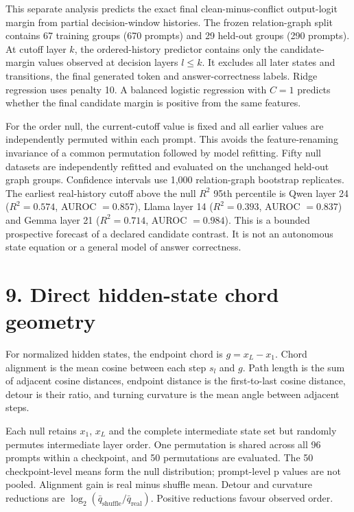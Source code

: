\documentclass[10pt]{article}
\begin{document}
This separate analysis predicts the exact final clean-minus-conflict output-logit margin from partial decision-window histories. The frozen relation-graph split contains 67 training groups (670 prompts) and 29 held-out groups (290 prompts). At cutoff layer \(k\), the ordered-history predictor contains only the candidate-margin values observed at decision layers \(l\leq k\). It excludes all later states and transitions, the final generated token and answer-correctness labels. Ridge regression uses penalty 10. A balanced logistic regression with \(C=1\) predicts whether the final candidate margin is positive from the same features.

For the order null, the current-cutoff value is fixed and all earlier values are independently permuted within each prompt. This avoids the feature-renaming invariance of a common permutation followed by model refitting. Fifty null datasets are independently refitted and evaluated on the unchanged held-out graph groups. Confidence intervals use 1,000 relation-graph bootstrap replicates. The earliest real-history cutoff above the null \(R^2\) 95th percentile is Qwen layer 24 (\(R^2=0.574\), AUROC \(=0.857\)), Llama layer 14 (\(R^2=0.393\), AUROC \(=0.837\)) and Gemma layer 21 (\(R^2=0.714\), AUROC \(=0.984\)). This is a bounded prospective forecast of a declared candidate contrast. It is not an autonomous state equation or a general model of answer correctness.

\section*{9. Direct hidden-state chord geometry}

For normalized hidden states, the endpoint chord is \(g=x_L-x_1\). Chord alignment is the mean cosine between each step \(s_l\) and \(g\). Path length is the sum of adjacent cosine distances, endpoint distance is the first-to-last cosine distance, detour is their ratio, and turning curvature is the mean angle between adjacent steps.

Each null retains \(x_1\), \(x_L\) and the complete intermediate state set but randomly permutes intermediate layer order. One permutation is shared across all 96 prompts within a checkpoint, and 50 permutations are evaluated. The 50 checkpoint-level means form the null distribution; prompt-level p values are not pooled. Alignment gain is real minus shuffle mean. Detour and curvature reductions are \(\log_2(\bar q_{\mathrm{shuffle}}/\bar q_{\mathrm{real}})\). Positive reductions favour observed order.
\end{document}
